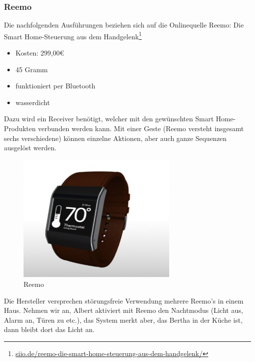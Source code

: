 \subsubsection{Reemo}

Die nachfolgenden Ausführungen beziehen sich auf die Onlinequelle \glqq Reemo: Die Smart Home-Steuerung aus dem Handgelenk\grqq\footnote{\url{siio.de/reemo-die-smart-home-steuerung-aus-dem-handgelenk/}}

\begin{itemize}
\item Kosten: 299,00€
\end{itemize}

\begin{itemize}
\item 45 Gramm
\item funktioniert per Bluetooth
\item wasserdicht
\end{itemize}

\noindent
Dazu wird ein Receiver benötigt, welcher mit den gewünschten Smart Home-Produkten verbunden werden kann. Mit einer Geste (Reemo versteht insgesamt sechs verschiedene) können einzelne Aktionen, aber auch ganze Sequenzen ausgelöst werden.

\begin{figure}[h!]
	\centering
	\includegraphics[width=0.7\textwidth]{img/Feedback-Mechanismen/Reemo.png}
	\caption{Reemo}
	\label{fig:feedbackReemo}
\end{figure}

Die Hersteller versprechen störungsfreie Verwendung mehrere Reemo's in einem Haus. Nehmen wir
an, Albert aktiviert mit Reemo den Nachtmodus (Licht aus, Alarm an, Türen zu etc.), das System
merkt aber, das Bertha in der Küche ist, dann bleibt dort das Licht an.

